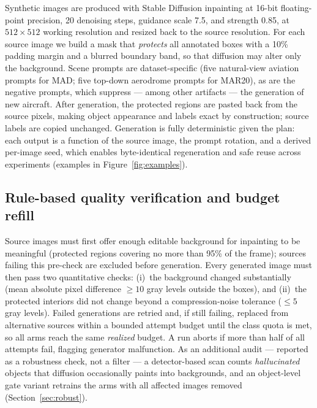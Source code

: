 \documentclass[preprint,12pt,authoryear]{elsarticle}
\begin{document}
Synthetic images are produced with Stable Diffusion inpainting
\citep[\texttt{runwayml/stable-diffusion-inpainting};][]{rombach2022ldm}
at 16-bit floating-point precision, 20 denoising steps, guidance scale
7.5, and strength 0.85, at $512\times512$ working resolution and resized
back to the source resolution. For each source image we build a mask
that \emph{protects} all annotated boxes with a 10\% padding margin and
a blurred boundary band, so that diffusion may alter only the
background. Scene prompts are dataset-specific (five natural-view
aviation prompts for MAD; five top-down aerodrome prompts for MAR20), as
are the negative prompts, which suppress --- among other artifacts ---
the generation of new aircraft. After generation, the protected regions
are pasted back from the source pixels, making object appearance and
labels exact by construction; source labels are copied unchanged.
Generation is fully deterministic given the plan: each output is a
function of the source image, the prompt rotation, and a derived
per-image seed, which enables byte-identical regeneration and safe reuse
across experiments (examples in Figure~\ref{fig:examples}).

\subsection{Rule-based quality verification and budget refill}\label{sec:verify}

Source images must first offer enough editable background for inpainting
to be meaningful (protected regions covering no more than 95\% of the
frame); sources failing this pre-check are excluded before generation.
Every generated image must then pass two quantitative checks: (i)~the
background changed substantially (mean absolute pixel difference $\geq
10$ gray levels outside the boxes), and (ii)~the protected interiors did
not change beyond a compression-noise tolerance ($\leq 5$ gray levels).
Failed generations are retried and, if still failing, replaced from
alternative sources within a bounded attempt budget until the class
quota is met, so all arms reach the same \emph{realized} budget. A run
aborts if more than half of all attempts fail, flagging generator
malfunction. As an additional audit --- reported as a robustness check,
not a filter --- a detector-based scan counts \emph{hallucinated}
objects that diffusion occasionally paints into backgrounds, and an
object-level gate variant retrains the arms with all affected images
removed (Section~\ref{sec:robust}).
\end{document}
